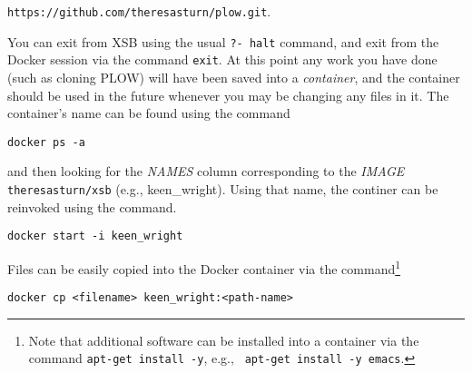 {\tt https://github.com/theresasturn/plow.git}.

You can exit from XSB using the usual {\tt ?- halt} command, and exit
from the Docker session via the command {\tt exit}.  At this point any
work you have done (such as cloning PLOW) will have been saved into a
{\em container}, and the container should be used in the future
whenever you may be changing any files in it.  The container's name can be found using the command 

\begin{verbatim}
docker ps -a
\end{verbatim}

and then looking for the {\em NAMES} column corresponding to the {\em
  IMAGE} {\tt theresasturn/xsb} (e.g., keen\_wright).  Using that
name, the continer can be reinvoked using the command.

\begin{verbatim}
docker start -i keen_wright
\end{verbatim}

Files can be easily copied into the Docker container via the
command\footnote{Note that additional software can be installed into a
  container via the command {\tt apt-get install -y}, e.g., {\tt
    apt-get install -y emacs}.}

\begin{verbatim}
docker cp <filename> keen_wright:<path-name>
\end{verbatim}

\ei


